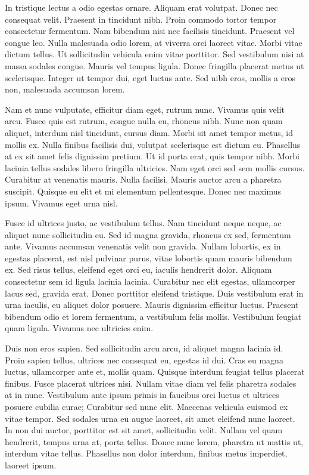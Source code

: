 \documentclass{homework}
\begin{document}
In tristique lectus a odio egestas ornare. Aliquam erat volutpat. Donec nec consequat velit. Praesent in tincidunt nibh. Proin commodo tortor tempor consectetur fermentum. Nam bibendum nisi nec facilisis tincidunt. Praesent vel congue leo. Nulla malesuada odio lorem, at viverra orci laoreet vitae. Morbi vitae dictum tellus. Ut sollicitudin vehicula enim vitae porttitor. Sed vestibulum nisi at massa sodales congue. Mauris vel tempus ligula. Donec fringilla placerat metus ut scelerisque. Integer ut tempor dui, eget luctus ante. Sed nibh eros, mollis a eros non, malesuada accumsan lorem.

Nam et nunc vulputate, efficitur diam eget, rutrum nunc. Vivamus quis velit arcu. Fusce quis est rutrum, congue nulla eu, rhoncus nibh. Nunc non quam aliquet, interdum nisl tincidunt, cursus diam. Morbi sit amet tempor metus, id mollis ex. Nulla finibus facilisis dui, volutpat scelerisque est dictum eu. Phasellus at ex sit amet felis dignissim pretium. Ut id porta erat, quis tempor nibh. Morbi lacinia tellus sodales libero fringilla ultricies. Nam eget orci sed sem mollis cursus. Curabitur at venenatis mauris. Nulla facilisi. Mauris auctor arcu a pharetra suscipit. Quisque eu elit et mi elementum pellentesque. Donec nec maximus ipsum. Vivamus eget urna nisl.

Fusce id ultrices justo, ac vestibulum tellus. Nam tincidunt neque neque, ac aliquet nunc sollicitudin eu. Sed id magna gravida, rhoncus ex sed, fermentum ante. Vivamus accumsan venenatis velit non gravida. Nullam lobortis, ex in egestas placerat, est nisl pulvinar purus, vitae lobortis quam mauris bibendum ex. Sed risus tellus, eleifend eget orci eu, iaculis hendrerit dolor. Aliquam consectetur sem id ligula lacinia lacinia. Curabitur nec elit egestas, ullamcorper lacus sed, gravida erat. Donec porttitor eleifend tristique. Duis vestibulum erat in urna iaculis, eu aliquet dolor posuere. Mauris dignissim efficitur luctus. Praesent bibendum odio et lorem fermentum, a vestibulum felis mollis. Vestibulum feugiat quam ligula. Vivamus nec ultricies enim.

Duis non eros sapien. Sed sollicitudin arcu arcu, id aliquet magna lacinia id. Proin sapien tellus, ultrices nec consequat eu, egestas id dui. Cras eu magna luctus, ullamcorper ante et, mollis quam. Quisque interdum feugiat tellus placerat finibus. Fusce placerat ultrices nisi. Nullam vitae diam vel felis pharetra sodales at in nunc. Vestibulum ante ipsum primis in faucibus orci luctus et ultrices posuere cubilia curae; Curabitur sed nunc elit. Maecenas vehicula euismod ex vitae tempor. Sed sodales urna eu augue laoreet, sit amet eleifend nunc laoreet. In non dui auctor, porttitor est sit amet, sollicitudin velit. Nullam vel quam hendrerit, tempus urna at, porta tellus. Donec nunc lorem, pharetra ut mattis ut, interdum vitae tellus. Phasellus non dolor interdum, finibus metus imperdiet, laoreet ipsum.
\end{document}
